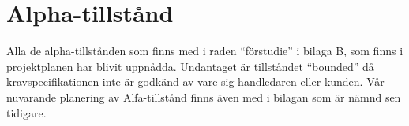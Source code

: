 \section{Alpha-tillstånd}
Alla de alpha-tillstånden som finns med i raden “förstudie” i bilaga B, som finns i projektplanen har blivit uppnådda. Undantaget är tillståndet “bounded” då kravspecifikationen inte är godkänd av vare sig handledaren eller kunden. Vår nuvarande planering av Alfa-tillstånd finns även med i bilagan som är nämnd sen tidigare. 